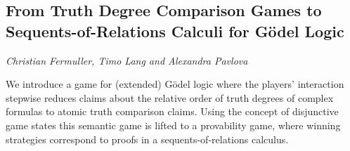 \documentclass[../booklet.tex]{subfiles}
\begin{document}
\subsection[From Truth Degree Comparison Games to Sequents-of-Relations Calculi for Gödel Logic. {\it Christian Fermuller, Timo Lang and Alexandra Pavlova}]{From Truth Degree Comparison Games to Sequents-of-Relations Calculi for Gödel Logic}
  

\begin{center}
  {\it Christian Fermuller, Timo Lang and Alexandra Pavlova}
\end{center}

\vskip 0.8cm


We introduce a game for (extended) G\"odel logic where the players'
interaction stepwise reduces claims about the relative order 
of truth degrees of complex formulas to atomic truth comparison claims.
Using the concept of disjunctive game states this semantic game is
lifted to a provability game, where winning strategies correspond to
proofs in a sequents-of-relations calculus.
\end{document}
